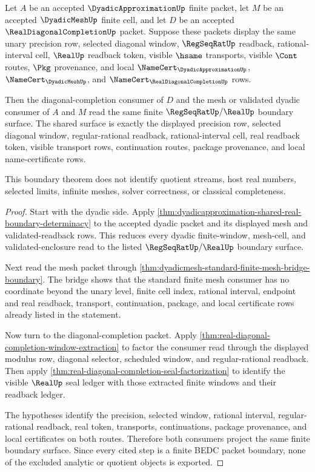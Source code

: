 \begin{theorem}
\label{thm:dyadicapproximation-diagonal-mesh-selector-boundary}
Let $A$ be an accepted $\DyadicApproximationUp$ finite packet, let $M$ be an
accepted $\DyadicMeshUp$ finite cell, and let $D$ be an accepted
$\RealDiagonalCompletionUp$ packet. Suppose these packets display the same
unary precision row, selected diagonal window, $\RegSeqRatUp$ readback,
rational-interval cell, $\RealUp$ readback token, visible $\hsame$
transports, visible $\Cont$ routes, $\Pkg$ provenance, and local
$\NameCert_{\DyadicApproximationUp}$, $\NameCert_{\DyadicMeshUp}$, and
$\NameCert_{\RealDiagonalCompletionUp}$ rows.

Then the diagonal-completion consumer of $D$ and the mesh or validated dyadic
consumer of $A$ and $M$ read the same finite $\RegSeqRatUp/\RealUp$ boundary
surface. The shared surface is exactly the displayed precision row, selected
diagonal window, regular-rational readback, rational-interval cell, real
readback token, visible transport rows, continuation routes, package
provenance, and local name-certificate rows.

This boundary theorem does not identify quotient streams, host real numbers,
selected limits, infinite meshes, solver correctness, or classical
completeness.
\end{theorem}
\begin{proof}
Start with the dyadic side. Apply
\autoref{thm:dyadicapproximation-shared-real-boundary-determinacy} to the
accepted dyadic packet and its displayed mesh and validated-readback rows.
This reduces every dyadic finite-window, mesh-cell, and validated-enclosure
read to the listed $\RegSeqRatUp/\RealUp$ boundary surface.

Next read the mesh packet through
\autoref{thm:dyadicmesh-standard-finite-mesh-bridge-boundary}. The bridge
shows that the standard finite mesh consumer has no coordinate beyond the
unary level, finite cell index, rational interval, endpoint and real readback,
transport, continuation, package, and local certificate rows already listed in
the statement.

Now turn to the diagonal-completion packet. Apply
\autoref{thm:real-diagonal-completion-window-extraction} to factor the
consumer read through the displayed modulus row, diagonal selector, scheduled
window, and regular-rational readback. Then apply
\autoref{thm:real-diagonal-completion-seal-factorization} to identify the
visible $\RealUp$ seal ledger with those extracted finite windows and their
readback ledger.

The hypotheses identify the precision, selected window, rational interval,
regular-rational readback, real token, transports, continuations, package
provenance, and local certificates on both routes. Therefore both consumers
project the same finite boundary surface. Since every cited step is a finite
BEDC packet boundary, none of the excluded analytic or quotient objects is
exported.
\end{proof}
